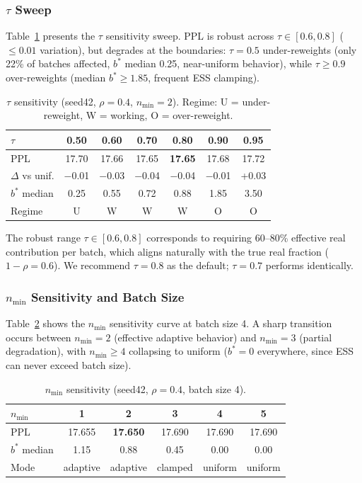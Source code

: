 \documentclass[11pt,a4paper]{article}
\newcommand{\bstar}{b^{*}}
\newcommand{\nmin}{n_{\min}}
\begin{document}
\subsubsection{$\tau$ Sweep}
\label{sec:tau-sweep}

Table~\ref{tab:tau} presents the $\tau$ sensitivity sweep.
PPL is robust across $\tau\in[0.6, 0.8]$ ($\leq 0.01$ variation), but degrades at the boundaries: $\tau=0.5$ under-reweights (only 22\% of batches affected, $\bstar$ median 0.25, near-uniform behavior), while $\tau\geq 0.9$ over-reweights (median $\bstar \geq 1.85$, frequent ESS clamping).

\begin{table}[t]
\centering
\small
\caption{$\tau$ sensitivity (seed42, $\rho=0.4$, $\nmin=2$). Regime: U = under-reweight, W = working, O = over-reweight.}
\label{tab:tau}
\begin{tabular}{lcccccc}
\toprule
$\tau$ & 0.50 & 0.60 & 0.70 & \textbf{0.80} & 0.90 & 0.95 \\
\midrule
PPL & 17.70 & 17.66 & 17.65 & \textbf{17.65} & 17.68 & 17.72 \\
$\Delta$ vs unif. & $-$0.01 & $-$0.03 & $-$0.04 & $-$0.04 & $-$0.01 & +0.03 \\
$\bstar$ median & 0.25 & 0.55 & 0.72 & 0.88 & 1.85 & 3.50 \\
Regime & U & W & W & W & O & O \\
\bottomrule
\end{tabular}
\end{table}

The robust range $\tau\in[0.6,0.8]$ corresponds to requiring 60--80\% effective real contribution per batch, which aligns naturally with the true real fraction ($1-\rho=0.6$).
We recommend $\tau=0.8$ as the default; $\tau=0.7$ performs identically.

\subsubsection{$\nmin$ Sensitivity and Batch Size}
\label{sec:nmin}

Table~\ref{tab:nmin} shows the $\nmin$ sensitivity curve at batch size 4.
A sharp transition occurs between $\nmin=2$ (effective adaptive behavior) and $\nmin=3$ (partial degradation), with $\nmin\geq 4$ collapsing to uniform ($\bstar=0$ everywhere, since ESS can never exceed batch size).

\begin{table}[t]
\centering
\small
\caption{$\nmin$ sensitivity (seed42, $\rho=0.4$, batch size 4).}
\label{tab:nmin}
\begin{tabular}{lccccc}
\toprule
$\nmin$ & 1 & \textbf{2} & 3 & 4 & 5 \\
\midrule
PPL & 17.655 & \textbf{17.650} & 17.690 & 17.690 & 17.690 \\
$\bstar$ median & 1.15 & 0.88 & 0.45 & 0.00 & 0.00 \\
Mode & adaptive & adaptive & clamped & uniform & uniform \\
\bottomrule
\end{tabular}
\end{table}
\end{document}
